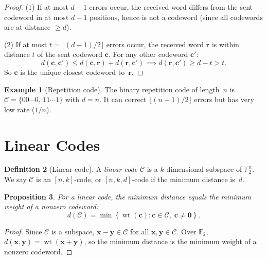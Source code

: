 \documentclass[12pt,a4paper,openany]{book}
\theoremstyle{definition}
\newtheorem{definition}{Definition}[chapter]
\newtheorem{example}[definition]{Example}
\theoremstyle{plain}
\newtheorem{proposition}[definition]{Proposition}
\theoremstyle{remark}
\newcommand{\set}[1]{\left\{#1\right\}}
\begin{document}
\begin{proof}
(1) If at most $d-1$ errors occur, the received word differs from the
sent codeword in at most $d-1$ positions, hence is not a codeword
(since all codewords are at distance $\ge d$).

(2) If at most $t=\lfloor(d-1)/2\rfloor$ errors occur, the received
word $\mathbf{r}$ is within distance $t$ of the sent codeword
$\mathbf{c}$.  For any other codeword $\mathbf{c}'$:
\[
  d(\mathbf{c},\mathbf{c}')\le d(\mathbf{c},\mathbf{r})
  +d(\mathbf{r},\mathbf{c}')
  \implies d(\mathbf{r},\mathbf{c}')\ge d-t>t.
\]
So $\mathbf{c}$ is the unique closest codeword to~$\mathbf{r}$.
\end{proof}

\begin{example}[Repetition code]
\label{ex:repetition}
The binary repetition code of length~$n$ is
$\mathcal{C}=\{00\cdots0,\,11\cdots1\}$ with $d=n$.  It can correct
$\lfloor(n-1)/2\rfloor$ errors but has very low rate ($1/n$).
\end{example}

\section{Linear Codes}
\label{sec:linear-codes}

\begin{definition}[Linear code]
\label{def:linear-code}
A \emph{linear code} $\mathcal{C}$ is a $k$-dimensional subspace of
$\mathbb{F}_2^n$.  We say $\mathcal{C}$ is an $[n,k]$-code, or
$[n,k,d]$-code if the minimum distance is~$d$.
\end{definition}

\begin{proposition}
\label{prop:linear-min-weight}
For a linear code, the minimum distance equals the minimum weight of a
nonzero codeword:
\[
  d(\mathcal{C})=\min\set{\operatorname{wt}(\mathbf{c})
    :\mathbf{c}\in\mathcal{C},\;\mathbf{c}\ne\mathbf{0}}.
\]
\end{proposition}

\begin{proof}
Since $\mathcal{C}$ is a subspace, $\mathbf{x}-\mathbf{y}\in\mathcal{C}$
for all $\mathbf{x},\mathbf{y}\in\mathcal{C}$.  Over $\mathbb{F}_2$,
$d(\mathbf{x},\mathbf{y})=\operatorname{wt}(\mathbf{x}+\mathbf{y})$,
so the minimum distance is the minimum weight of a nonzero codeword.
\end{proof}
\end{document}
